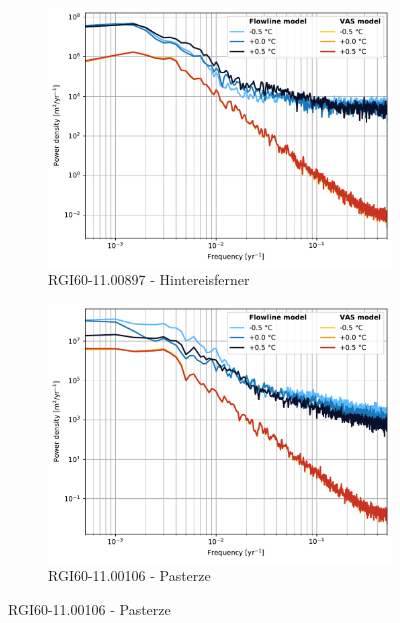       \begin{figure}[htp]
        \centering
        \begin{subfigure}[b]{0.48\textwidth}
          \caption{RGI60-11.00897 - Hintereisferner}
          \label{fig:psd:hintereisferner}
          \centering
          \includegraphics[width=\textwidth]{../plots/final_plots/psd/Hintereisferner.pdf}
        \end{subfigure}
        \hfill
        \begin{subfigure}[b]{0.48\textwidth}
          \caption{RGI60-11.00106 - Pasterze}
          \label{fig:psd:pasterze}
          \centering
          \includegraphics[width=\textwidth]{../plots/final_plots/psd/Pasterze.pdf}
        \end{subfigure}

\end{figure}
